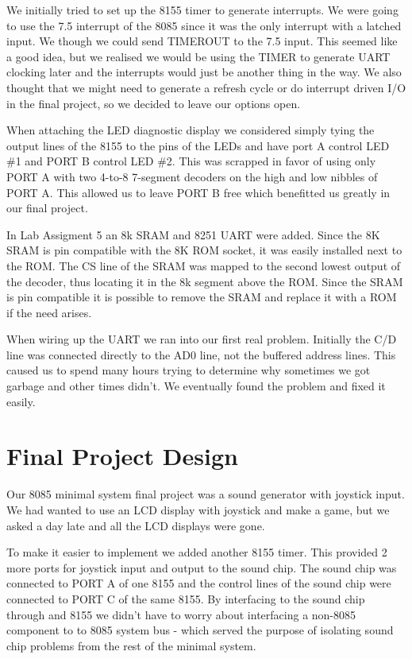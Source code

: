 We initially tried to set up the 8155 timer to generate interrupts.  We were going to use
the 7.5 interrupt of the 8085 since it was the only interrupt with a latched input.  We though we
could send TIMEROUT to the 7.5 input.  This seemed like a good idea, but we realised we would be
using the TIMER to generate UART clocking later and the interrupts would just be another thing
in the way.  We also thought that we might need to generate a refresh cycle or do interrupt driven
I/O in the final project, so we decided to leave our options open.

When attaching the LED diagnostic display we considered simply tying the output lines of the
8155 to the pins of the LEDs and have port A control LED \#1 and PORT B control LED \#2.  This was
scrapped in favor of using only PORT A with two 4-to-8 7-segment decoders on the high and low
nibbles of PORT A.  This allowed us to leave PORT B free which benefitted us greatly in our final
project.

In Lab Assigment 5 an 8k SRAM and 8251 UART were added.  Since the 8K SRAM is pin compatible
with the 8K ROM socket, it was easily installed next to the ROM.  The CS line of the SRAM was mapped
to the second lowest output of the decoder, thus locating it in the 8k segment above the ROM.  Since
the SRAM is pin compatible it is possible to remove the SRAM and replace it with a ROM if the need
arises.

When wiring up the UART we ran into our first real problem.  Initially the C/D line was connected
directly to the AD0 line, not the buffered address lines.  This caused us to spend many hours trying
to determine why sometimes we got garbage and other times didn't.  We eventually found the problem
and fixed it easily.

\section{Final Project Design}

Our 8085 minimal system final project was a sound generator with joystick input.  We had wanted to
use an LCD display with joystick and make a game, but we asked a day late and all the LCD displays
were gone.

To make it easier to implement we added another 8155 timer.  This provided 2 more ports for joystick
input and output to the sound chip.  The sound chip was connected to PORT A of one 8155 and the
control lines of the sound chip were connected to PORT C of the same 8155.  By interfacing to the
sound chip through and 8155 we didn't have to worry about interfacing a non-8085 component to
to 8085 system bus - which served the purpose of isolating sound chip problems from the rest
of the minimal system.

